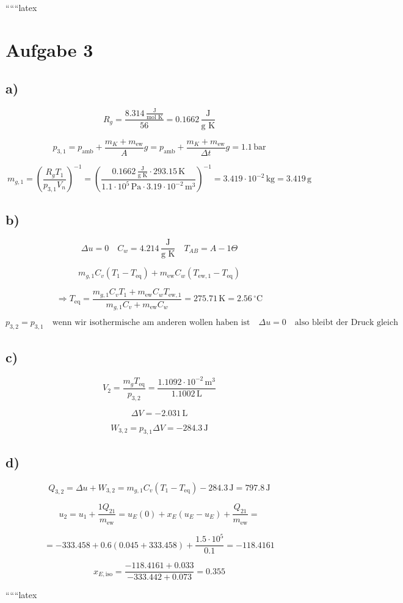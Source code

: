 
``````latex


\section*{Aufgabe 3}

\subsection*{a)}
\[
R_g = \frac{8.314 \, \frac{\text{J}}{\text{mol K}}}{56} = 0.1662 \, \frac{\text{J}}{\text{g K}}
\]

\[
p_{3,1} = p_{\text{amb}} + \frac{m_{K} + m_{\text{ew}}}{A} g = p_{\text{amb}} + \frac{m_{K} + m_{\text{ew}}}{\Delta t} g = 1.1 \, \text{bar}
\]

\[
m_{g,1} = \left( \frac{R_g T_{1}}{p_{3,1} V_{n}} \right)^{-1} = \left( \frac{0.1662 \, \frac{\text{J}}{\text{g K}} \cdot 293.15 \, \text{K}}{1.1 \cdot 10^5 \, \text{Pa} \cdot 3.19 \cdot 10^{-2} \, \text{m}^3} \right)^{-1} = 3.419 \cdot 10^{-2} \, \text{kg} = 3.419 \, \text{g}
\]

\subsection*{b)}
\[
\Delta u = 0 \quad C_w = 4.214 \, \frac{\text{J}}{\text{g K}} \quad T_{A B} = A - 1 \Theta
\]

\[
m_{g,1} C_v (T_{1} - T_{\text{eq}}) + m_{\text{ew}} C_w (T_{\text{ew},1} - T_{\text{eq}})
\]

\[
\Rightarrow T_{\text{eq}} = \frac{m_{g,1} C_v T_{1} + m_{\text{ew}} C_w T_{\text{ew},1}}{m_{g,1} C_v + m_{\text{ew}} C_w} = 275.71 \, \text{K} = 2.56 \, ^\circ \text{C}
\]

\[
p_{3,2} = p_{3,1} \quad \text{wenn wir isothermische am anderen wollen haben ist} \quad \Delta u = 0 \quad \text{also bleibt der Druck gleich}
\]

\subsection*{c)}
\[
V_{2} = \frac{m_{g} T_{\text{eq}}}{p_{3,2}} = \frac{1.1092 \cdot 10^{-2} \, \text{m}^3}{1.1002 \, \text{L}}
\]

\[
\Delta V = -2.031 \, \text{L}
\]

\[
W_{3,2} = p_{3,1} \Delta V = -284.3 \, \text{J}
\]

\subsection*{d)}
\[
Q_{3,2} = \Delta u + W_{3,2} = m_{g,1} C_v (T_{1} - T_{\text{eq}}) - 284.3 \, \text{J} = 797.8 \, \text{J}
\]

\[
u_{2} = u_{1} + \frac{1 Q_{21}}{m_{\text{ew}}} = u_{E}(0) + x_{E}(u_{E} - u_{E}) + \frac{Q_{21}}{m_{\text{ew}}} =
\]

\[
= -333.458 + 0.6 (0.045 + 333.458) + \frac{1.5 \cdot 10^5}{0.1} = -118.4161
\]

\[
x_{E, \text{iso}} = \frac{-118.4161 + 0.033}{-333.442 + 0.073} = 0.355
\]

``````latex


